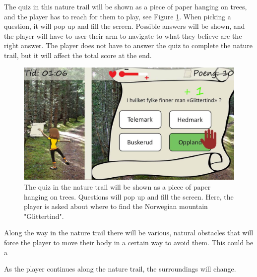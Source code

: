 The quiz in this nature trail will be shown as a piece of paper hanging on trees, and the player has to reach for them to play, see Figure \ref{fig:quiz}. When picking a question, it will pop up and fill the screen. Possible answers will be shown, and the player will have to user their arm to navigate to what they believe are the right answer. The player does not have to answer the quiz to complete the nature trail, but it will affect the total score at the end. 

\begin{figure} [H]
\centering
\includegraphics[scale=0.5]{quiz.jpg}
\caption[Nature trail - quiz]{The quiz in the nature trail will be shown as a piece of paper hanging on trees. Questions will pop up and fill the screen. Here, the player is asked about where to find the Norwegian mountain "Glittertind".}
\label{fig:quiz}
\end{figure} 

Along the way in the nature trail there will be various, natural obstacles that will force the player to move their body in a certain way to avoid them. This could be a 

As the player continues along the nature trail, the surroundings will change.

